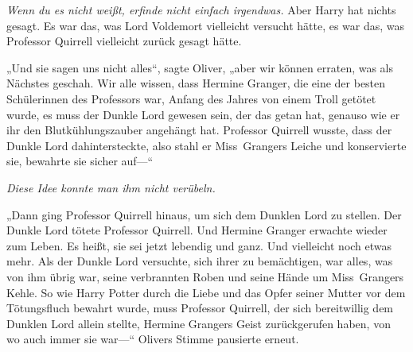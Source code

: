 \emph{Wenn du es nicht weißt, erfinde nicht einfach irgendwas.}
Aber Harry hat nichts gesagt. Es war das, was Lord Voldemort vielleicht versucht hätte, es war das, was Professor Quirrell vielleicht zurück gesagt hätte.

„Und sie sagen uns nicht alles“, sagte Oliver, „aber wir können erraten, was als Nächstes geschah. Wir alle wissen, dass Hermine Granger, die eine der besten Schülerinnen des Professors war, Anfang des Jahres von einem Troll getötet wurde, es muss der Dunkle Lord gewesen sein, der das getan hat, genauso wie er ihr den Blutkühlungszauber angehängt hat. Professor Quirrell wusste, dass der Dunkle Lord dahintersteckte, also stahl er Miss~Grangers Leiche und konservierte sie, bewahrte sie sicher auf—“

\emph{Diese Idee konnte man ihm nicht verübeln.}

„Dann ging Professor Quirrell hinaus, um sich dem Dunklen Lord zu stellen. Der Dunkle Lord tötete Professor Quirrell. Und Hermine Granger erwachte wieder zum Leben. Es heißt, sie sei jetzt lebendig und ganz. Und vielleicht noch etwas mehr.
Als der Dunkle Lord versuchte, sich ihrer zu bemächtigen, war alles, was von ihm übrig war, seine verbrannten Roben und seine Hände um Miss~Grangers Kehle.
So wie Harry Potter durch die Liebe und das Opfer seiner Mutter vor dem Tötungsfluch bewahrt wurde, muss Professor Quirrell, der sich bereitwillig dem Dunklen Lord allein stellte, Hermine Grangers Geist zurückgerufen haben, von wo auch immer sie war—“
Olivers Stimme pausierte erneut.

